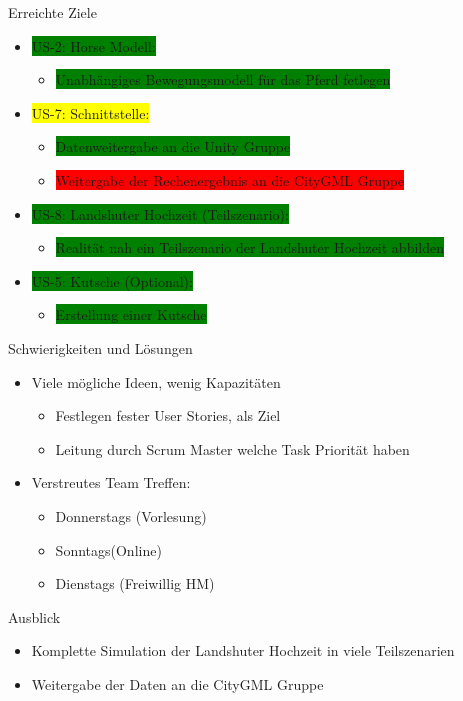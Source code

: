 \begin{frame}{Erreichte Ziele}
	\begin{center}
		\begin{itemize}
			\item \colorbox{green} {US-2: Horse Modell:}
			\begin{itemize}
				\item \colorbox{green} {Unabhängiges Bewegungsmodell für das Pferd fetlegen}
			\end{itemize}
			\item \colorbox{yellow} {US-7: Schnittstelle:}
			\begin{itemize}
				\item \colorbox{green} {Datenweitergabe an die Unity Gruppe}
				\item \colorbox{red}{Weitergabe der Rechenergebnis an die CityGML Gruppe}
			\end{itemize} 
		
			\item \colorbox{green} {US-8: Landshuter Hochzeit (Teilszenario):}
			\begin{itemize}
				\item \colorbox{green}{Realität nah ein Teilszenario der Landshuter Hochzeit abbilden}
			\end{itemize}
			\item \colorbox{green}{US-5: Kutsche (Optional):} 
			\begin{itemize}
				\item \colorbox{green}{Erstellung einer Kutsche}
			\end{itemize}
		\end{itemize}
	\end{center}
\end{frame}

\begin{frame}{Schwierigkeiten und Lösungen}
	\begin{itemize}
		\item Viele mögliche Ideen, wenig Kapazitäten
		 \begin{itemize}
			\item Festlegen fester User Stories, als Ziel 
			\item Leitung durch Scrum Master welche Task Priorität haben
		\end{itemize} 
		\item Verstreutes Team
			 \newline Treffen:
			 \begin{itemize}
			 	\item Donnerstags (Vorlesung)
			 	\item Sonntags(Online)
			 	\item Dienstags (Freiwillig HM)
			 \end{itemize} 
	\end{itemize}
\end{frame}

\begin{frame}{Ausblick}
	\begin{itemize}
		\item Komplette Simulation der Landshuter Hochzeit in viele Teilszenarien
		\item Weitergabe der Daten an die CityGML Gruppe
	\end{itemize}
\end{frame}
